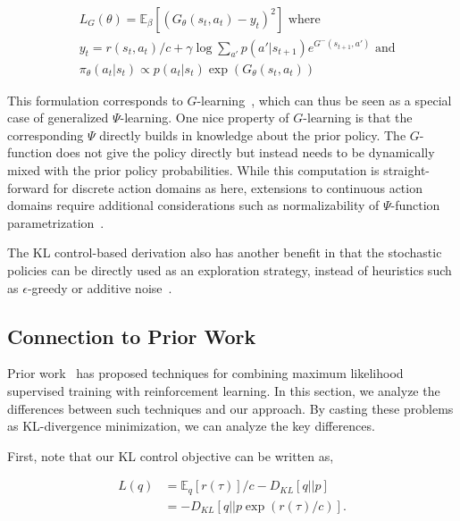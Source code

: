 \begin{equation}
\begin{split}
\label{eq:g_loss}
&L_{G}(\theta)= \mathbb{E}_\beta[( G_\theta(s_t,a_t)-y_t)^2] \textrm{ where}\\
&y_t = r(s_t,a_t)/c + \gamma \log \sum_{a'} p(a'|s_{t+1})e^{G^-(s_{t+1}, a')} \textrm{ and}\\
&\pi_\theta(a_t|s_t) \propto p(a_t|s_{t})\exp(G_\theta(s_t,a_t))
\end{split}
\end{equation}

This formulation corresponds to $G$-learning~\citep{foxtaming}, which can thus be seen as a special case of generalized $\Psi$-learning. One nice property of $G$-learning is that the corresponding $\Psi$ directly builds in knowledge about the prior policy. The $G$-function does not give the policy directly but instead needs to be dynamically mixed with the prior policy probabilities. While this computation is straight-forward for discrete action domains as here, extensions to continuous action domains require additional considerations such as normalizability of $\Psi$-function parametrization~\citep{glls-cdqlm-16}. 

The KL control-based derivation also has another benefit in that the stochastic policies can be directly used as an exploration strategy, instead of heuristics such as $\epsilon$-greedy or additive noise~\citep{dqn,lhphe-ccdrl-16}. 

\iffalse 
\subsection{Connection to Prior Work}

Prior work~\citep{norouzi2016reward} has proposed techniques for combining maximum likelihood supervised training with reinforcement learning. In this section, we analyze the differences between such techniques and our approach. By casting these problems as KL-divergence minimization, we can analyze the key differences.

First, note that our KL control objective can be written as,

\begin{equation}
\begin{split}
\label{eq:kl_control2}
L(q) &= \mathbb{E}_{q}[r(\tau)]/c - D_{KL}[q||p] \\
&= -D_{KL}[q||p\exp(r(\tau)/c)].
\end{split}
\end{equation}


